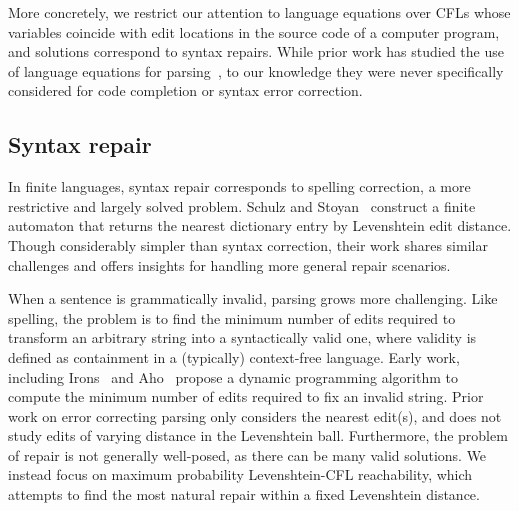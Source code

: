 \documentclass[sigplan,review,acmsmall,nonacm,screen,anonymous]{acmart}\settopmatter{printfolios=false,printccs=false,printacmref=false}
\begin{document}

More concretely, we restrict our attention to language equations over CFLs whose variables coincide with edit locations in the source code of a computer program, and solutions correspond to syntax repairs. While prior work has studied the use of language equations for parsing~\cite{might2011parsing}, to our knowledge they were never specifically considered for code completion or syntax error correction.

\subsection{Syntax repair}

In finite languages, syntax repair corresponds to spelling correction, a more restrictive and largely solved problem. Schulz and Stoyan~\cite{schulz2002fast} construct a finite automaton that returns the nearest dictionary entry by Levenshtein edit distance. Though considerably simpler than syntax correction, their work shares similar challenges and offers insights for handling more general repair scenarios.

When a sentence is grammatically invalid, parsing grows more challenging. Like spelling, the problem is to find the minimum number of edits required to transform an arbitrary string into a syntactically valid one, where validity is defined as containment in a (typically) context-free language. Early work, including Irons~\cite{irons1963error} and Aho~\cite{aho1972minimum} propose a dynamic programming algorithm to compute the minimum number of edits required to fix an invalid string. Prior work on error correcting parsing only considers the nearest edit(s), and does not study edits of varying distance in the Levenshtein ball. Furthermore, the problem of repair is not generally well-posed, as there can be many valid solutions. We instead focus on maximum probability Levenshtein-CFL reachability, which attempts to find the most natural repair within a fixed Levenshtein distance.
\end{document}
